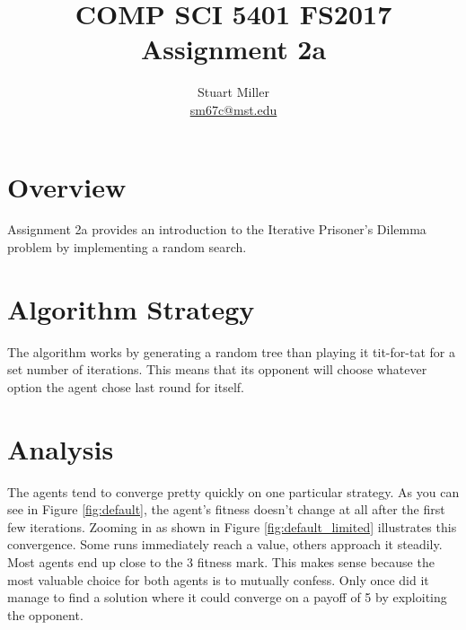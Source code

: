 \documentclass[11pt]{article}
\begin{document}
\title{COMP SCI 5401 FS2017 Assignment 2a}
\author{Stuart Miller\\\href{mailto:sm67c@mst.edu}{sm67c@mst.edu}}
\maketitle


\section{Overview}\label{sect:overview}

Assignment 2a provides an introduction to the Iterative Prisoner's Dilemma problem by implementing a random search. 


\section{Algorithm Strategy}\label{sect:alg_strat}
The algorithm works by generating a random tree than playing it tit-for-tat for a set number of iterations. This means that its opponent will choose whatever option the agent chose last round for itself.


\section{Analysis}\label{sect:analysis}
The agents tend to converge pretty quickly on one particular strategy. As you can see in Figure \ref{fig:default}, the agent's fitness doesn't change at all after the first few iterations. Zooming in as shown in Figure \ref{fig:default_limited} illustrates this convergence. Some runs immediately reach a value, others approach it steadily. Most agents end up close to the 3 fitness mark. This makes sense because the most valuable choice for both agents is to mutually confess. Only once did it manage to find a solution where it could converge on a payoff of 5 by exploiting the opponent.
\end{document}
